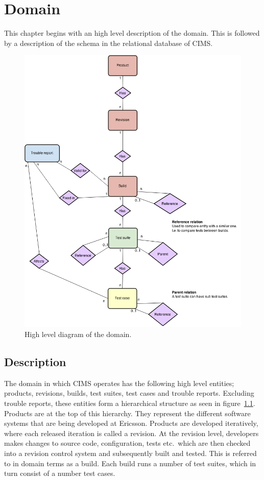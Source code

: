 \chapter{Domain}
\label{chap:domain}

This chapter begins with an high level description of the domain. This is followed by a description of the schema in the relational database of CIMS.
\begin{figure}[h!]
\centering
\includegraphics[scale=0.5]{figure/er_diagram.png}
\caption{High level diagram of the domain.}
\label{fig:er}
\end{figure}

\section{Description}
The domain in which CIMS operates has the following high level entities; products, revisions, builds, test suites, test cases and trouble reports. Excluding trouble reports, these entities form a hierarchical structure as seen in figure~\ref{fig:er}. Products are at the top of this hierarchy. They represent the different software systems that are being developed at Ericsson. Products are developed iteratively, where each released iteration is called a revision. At the revision level, developers makes changes to source code, configuration, tests etc.\ which are then checked into a revision control system and subsequently built and tested. This is referred to in domain terms as a build. Each build runs a number of test suites, which in turn consist of a number test cases.

